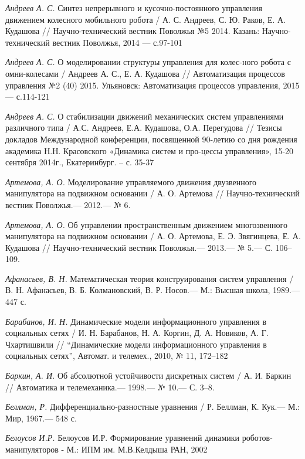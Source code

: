 \begin{thebibliography}{10}
	{\it Андреев А. С.} Синтез непрерывного и кусочно-постоянного управления движением колесного мобильного робота / А. С. Андреев, С. Ю. Раков, Е. А. Кудашова  //
	Научно-технический вестник Поволжья №5 2014. Казань: Научно-технический вестник Поволжья, 2014 — с.97-101


	{\it Андреев А. С.} О моделировании структуры управления для колес-ного робота с омни-колесами / Андреев А. С., Е. А. Кудашова // Автоматизация процессов управления №2 (40) 2015. Ульяновск: Автоматизация процессов управления, 2015 — с.114-121
	
	
	{\it Андреев А. С.} О стабилизации движений механических систем управлениями различного типа / А.С. Андреев, Е.А. Кудашова, О.А. Перегудова // Тезисы докладов Международной конференции, посвященной 90-летию со дня рождения академика Н.Н. Красовского «Динамика систем и про-цессы управления», 15-20 сентября 2014г., Екатеринбург. – с. 35-37

	
	{\it Артемова, А. О.} Моделирование управляемого движения двузвенного манипулятора на подвижном основании /
	А. О. Артемова // Научно-технический вестник Поволжья.— 2012.— № 6.
	
	{\it Артемова, А. О.} Об управлении пространственным движением многозвенного манипулятора на подвижном основании /
	А. О. Артемова, Е. Э. Звягинцева, Е. А. Кудашова // Научно-технический вестник Поволжья.— 2013.— № 5.— С. 106–109.
	
	{\it Афанасьев, В. Н.} Математическая теория конструирования систем управления /
	В. Н. Афанасьев, В. Б. Колмановский, В. Р. Носов.— М.: Высшая школа, 1989.— 447 с.

	{\it Барабанов, И. Н.} Динамические модели информационного управления в социальных сетях / И. Н. Барабанов, Н. А. Коргин, Д. А. Новиков, А. Г. Чхартишвили // “Динамические модели информационного управления в социальных сетях”, Автомат. и телемех., 2010, № 11, 172–182
	
	
	{\it Баркин, А. И.} Об абсолютной устойчивости дискретных систем / А. И. Баркин // Автоматика и телемеханика.— 1998.— № 10.— С. 3–8.
	
	{\it Беллман, Р.} Дифференциально-разностные уравнения / Р. Беллман, К. Кук.— М.: Мир,
	1967.— 548 с.
	
	{\it Белоусов И.Р.} Белоусов И.Р. Формирование уравнений динамики роботов-  манипуляторов - М.: ИПМ им. М.В.Келдыша РАН, 2002
	

\end{thebibliography}
